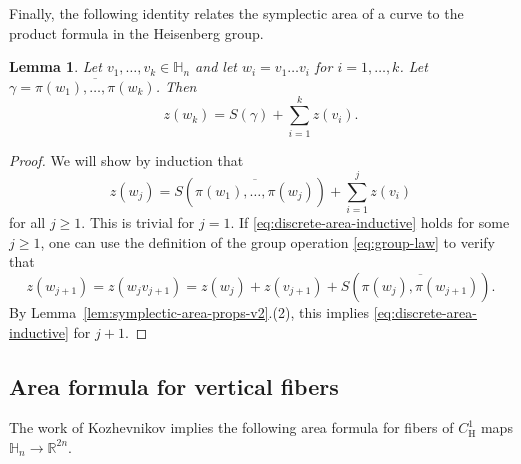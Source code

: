 \documentclass[12pt,reqno]{amsart}
\newcommand{\HH}{\mathbb{H}}
\newtheorem{lemma}[thm]{Lemma}
\theoremstyle{remark}
\newcommand{\0}{\mathbf{0}}
\renewcommand{\1}{\mathbf 1}
\begin{document}
Finally, the following identity relates the symplectic area of a curve to the product formula in the Heisenberg group.
\begin{lemma}\label{lem:discrete-area-z}
  Let $v_1,\dots, v_k\in \HH_n$ and let $w_i=v_1\dots v_i$ for $i=1,\dots,k$. Let $\gamma= \overline{\pi(w_1),\dots,\pi(w_k)}$. Then 
  $$
  z(w_k) = S(\gamma) + \sum_{i=1}^k z(v_i).
  $$
\end{lemma} 
\begin{proof}
  We will show by induction that
  \begin{equation}\label{eq:discrete-area-inductive}
    z(w_j) = S(\overline{\pi(w_1),\dots,\pi(w_j)}) + \sum_{i=1}^j z(v_i)
  \end{equation}
  for all $j\ge 1$. This is trivial for $j=1$. If \eqref{eq:discrete-area-inductive} holds for some $j\ge 1$, one can use the definition of the group operation \eqref{eq:group-law} to verify that 
    \[
    z(w_{j+1}) = z(w_j v_{j+1}) = z(w_j) + z(v_{j+1}) + S(\overline{\pi(w_j),\pi(w_{j+1})}).
  \]
  By Lemma~\ref{lem:symplectic-area-props-v2}.(2), this implies \eqref{eq:discrete-area-inductive} for $j+1$.
\end{proof}


\subsection{Area formula for vertical fibers}\label{sec:AreaKoz}
The work of Kozhevnikov \cite{Kozhevnikov} implies the following area formula
for fibers of $C^1_{\mathrm{H}}$ maps $\HH_n\to\mathbb R^{2n}$.
\end{document}
